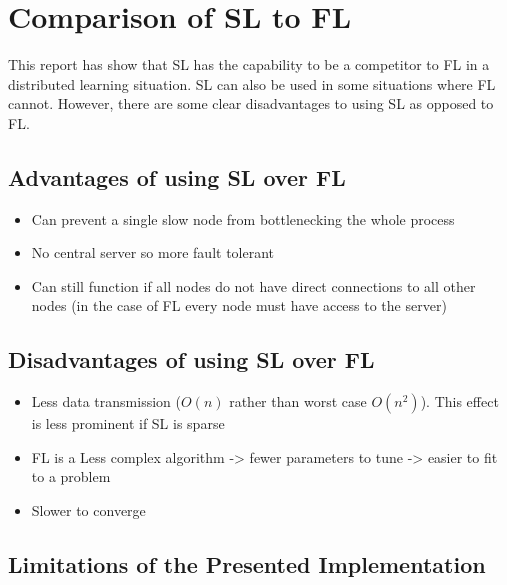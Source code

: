 \section{Comparison of SL to FL}

This report has show that SL has the capability to be a competitor to FL in a distributed learning situation. SL can also be used in some situations where FL cannot. However, there are some clear disadvantages to using SL as opposed to FL.

\subsection{Advantages of using SL over FL}

\begin{itemize}
	\item Can prevent a single slow node from bottlenecking the whole process
	\item No central server so more fault tolerant
	\item Can still function if all nodes do not have direct connections to all other nodes (in the case of FL every node must have access to the server)
\end{itemize}


\subsection{Disadvantages of using SL over FL}
\begin{itemize}
	\item Less data transmission ($O(n)$ rather than worst case $O(n^2)$). This effect is less prominent if SL is sparse
	\item FL is a Less complex algorithm -> fewer parameters to tune -> easier to fit to a problem
	\item Slower to converge
\end{itemize}


\subsection{Limitations of the Presented Implementation}
